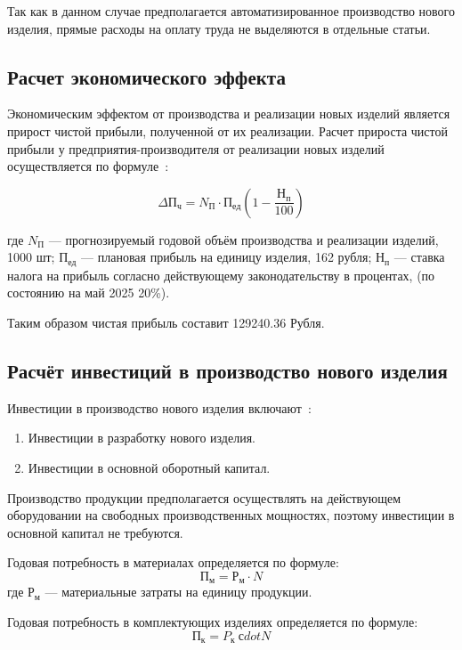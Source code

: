 Так как в данном случае предполагается автоматизированное производство
нового изделия, прямые расходы на оплату труда не выделяются в
отдельные статьи.

\subsection{Расчет экономического эффекта}

Экономическим эффектом от производства и реализации новых изделий
является прирост чистой прибыли, полученной от их реализации.  Расчет
прироста чистой прибыли у предприятия-производителя от реализации
новых изделий осуществляется по
формуле~\cite{bsuir-project-economics}:

\begin{equation}
  \Delta П_ч=N_П \cdot П_{ед} ( 1- \frac{Н_п}{100} )
\end{equation}

где $N_П$ — прогнозируемый годовой объём производства и реализации
изделий, 1000 шт; $П_{ед}$ — плановая прибыль на единицу изделия, 162 рубля;
$Н_п$ — ставка налога на прибыль согласно действующему законодательству в процентах,
(по состоянию на май 2025 20\%).

Таким образом чистая прибыль составит 129240.36 Рубля.


\subsection{Расчёт инвестиций в производство нового изделия}

Инвестиции в производство нового изделия включают~\cite{bsuir-project-economics}:
\begin{enumerate}
\item Инвестиции в разработку нового изделия.
\item Инвестиции в основной оборотный капитал.
\end{enumerate}

Производство продукции предполагается осуществлять на действующем
оборудовании на свободных производственных мощностях, поэтому
инвестиции в основной капитал не требуются.

Годовая потребность в материалах определяется по формуле:
\begin{equation}
  П_м = Р_м \cdot N
\end{equation}
где $Р_м$ — материальные затраты на единицу продукции.

Годовая потребность в комплектующих изделиях определяется по формуле:
\begin{equation}
  П_к = P_к \ сdot N
\end{equation}

